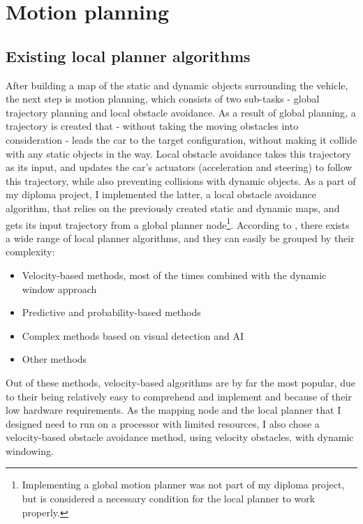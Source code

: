 \chapter{Motion planning}

\section{Existing local planner algorithms}
\label{chap:existing_local_planner_algorithms}
After building a map of the static and dynamic objects surrounding the vehicle, the next step is motion planning, which consists of two sub-tasks - global trajectory planning and local obstacle avoidance. As a result of global planning, a trajectory is created that - without taking the moving obstacles into consideration - leads the car to the target configuration, without making it collide with any static objects in the way. Local obstacle avoidance takes this trajectory as its input, and updates the car's actuators (acceleration and steering) to follow this trajectory, while also preventing collisions with dynamic objects.
As a part of my diploma project, I implemented the latter, a local obstacle avoidance algorithm, that relies on the previously created static and dynamic maps, and gets its input trajectory from a global planner node\footnote{Implementing a global motion planner was not part of my diploma project, but is considered a necessary condition for the local planner to work properly.}. According to \cite{DynamicMotionPlanningSurvey}, there exists a wide range of local planner algorithms, and they can easily be grouped by their complexity:

\begin{itemize}
  \item Velocity-based methods, most of the times combined with the dynamic window approach
  \item Predictive and probability-based methods
  \item Complex methods based on visual detection and AI
  \item Other methods
\end{itemize}

Out of these methods, velocity-based algorithms are by far the most popular, due to their being relatively easy to comprehend and implement and because of their low hardware requirements. As the mapping node and the local planner that I designed need to run on a processor with limited resources, I also chose a velocity-based obstacle avoidance method, using velocity obstacles, with dynamic windowing.


